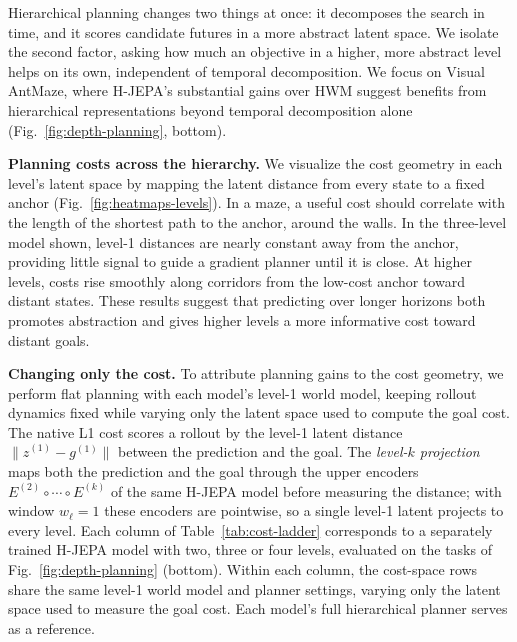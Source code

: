 Hierarchical planning changes two things at once: it decomposes the search in
time, and it scores candidate futures in a more abstract latent space. We
isolate the second factor, asking how much an objective in a higher, more
abstract level helps on its own, independent of temporal decomposition. We
focus on Visual AntMaze, where H-JEPA's substantial gains over HWM suggest
benefits from hierarchical representations beyond temporal decomposition alone
(Fig.~\ref{fig:depth-planning}, bottom).

\textbf{Planning costs across the hierarchy.} We visualize the cost geometry in
each level's latent space by mapping the latent distance from every state to a fixed
anchor (Fig.~\ref{fig:heatmaps-levels}). In a maze, a useful cost should correlate
with the length of the shortest path to the anchor, around the walls. In the
three-level model shown, level-1 distances are nearly constant away from the
anchor, providing little signal to guide a gradient planner until it is
close. At higher levels, costs rise smoothly along corridors from the low-cost
anchor toward distant states.
These results suggest that predicting over longer horizons both promotes
abstraction and gives higher levels a more informative cost toward distant goals.

\textbf{Changing only the cost.} To attribute planning gains to the cost geometry, we
perform flat planning with each model's level-1 world model, keeping rollout dynamics
fixed while varying only the latent space used to compute the goal cost.
The native L1 cost scores a rollout by the level-1 latent
distance $\lVert \hat{z}^{(1)} - g^{(1)}\rVert$ between the prediction and the goal.
The \emph{level-$k$ projection} maps both the prediction and the goal through the
upper encoders $E^{(2)}\circ\cdots\circ E^{(k)}$ of the same H-JEPA model before measuring
the distance; with window $w_\ell{=}1$ these encoders are pointwise, so a single
level-1 latent projects to every level. Each column of Table~\ref{tab:cost-ladder}
corresponds to a separately trained H-JEPA model with two, three or four levels,
evaluated on the tasks of Fig.~\ref{fig:depth-planning} (bottom). Within each
column, the cost-space rows share the same level-1 world model and planner
settings, varying only the latent space used to measure the goal cost. Each
model's full hierarchical planner serves as a reference.

